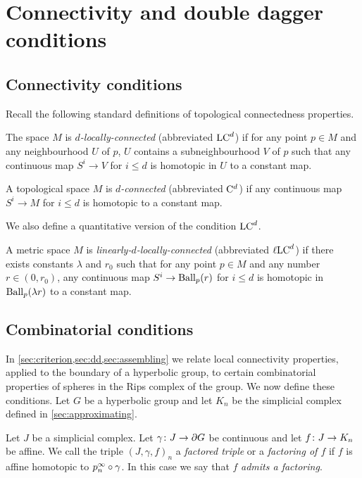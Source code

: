 \documentclass[a4paper]{article}
\begin{document}
\section{Connectivity and double dagger conditions}\label{sec:connectivity}

\subsection{Connectivity conditions}

Recall the following standard definitions of topological connectedness 
properties.

\begin{definition}
  The space $M$ is \emph{$d$-locally-connected} (abbreviated $\mathrm{LC}^{d}$) if for any 
  point $p \in M$ and any neighbourhood $U$ of $p$, $U$ contains a 
  subneighbourhood $V$ of $p$ such that any continuous map $S^i \to V$ for $i 
  \leq d$ is homotopic in $U$ to a constant map.

  A topological space $M$ is \emph{$d$-connected} (abbreviated $\mathrm{C}^{d}$) if 
  any continuous map $S^i \to M$ for $i \leq d$ is homotopic to a constant map.
\end{definition}

We also define a quantitative version of the condition $\mathrm{LC}^{d}$.

\begin{definition}
  A metric space $M$ is \emph{linearly-$d$-locally-connected} (abbreviated 
  $\ell\mathrm{LC}^{d}$) if there exists constants $\lambda$ and $r_0$ such that for any 
  point $p \in M$ and any number $r \in (0,r_0)$, any continuous map $S^i \to 
  \operatorname{Ball}_p(r)$ for $i \leq d$ is homotopic in $\operatorname{Ball}_p(\lambda r)$ to a constant 
  map.
\end{definition}

\subsection{Combinatorial conditions}

In \cref{sec:criterion,sec:dd,sec:assembling} we relate local connectivity
properties, applied to the boundary of a hyperbolic group, to certain
combinatorial properties of spheres in the Rips complex of the group. We now
define these conditions. Let $G$ be a hyperbolic group and let $K_n$ be the
simplicial complex defined in \cref{sec:approximating}.

\begin{definition}
  Let $J$ be a simplicial complex. Let $\gamma \colon J \to \partial G$ be 
  continuous and let $f\colon J \to K_n$ be affine. We call the triple $(J, 
  \gamma, f)_n$ a \emph{factored triple} or a \emph{factoring of $f$} if $f$ is 
  affine homotopic to $p^\infty_n\circ\gamma$. In this case we say that $f$ 
  \emph{admits a factoring}.
\end{definition}
\end{document}
